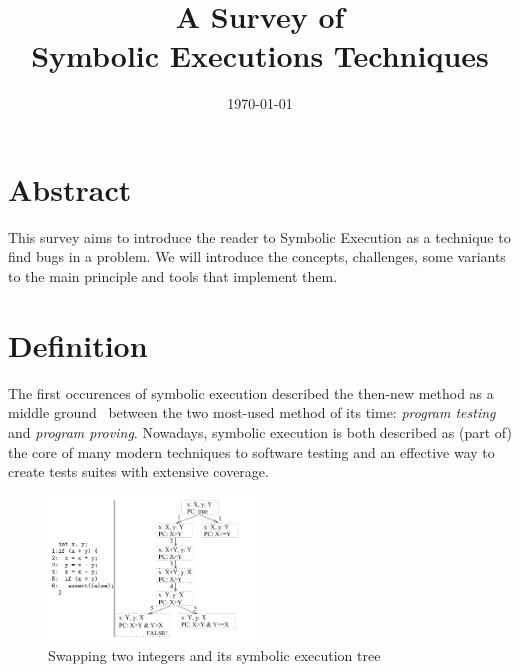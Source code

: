 \documentclass[11pt, conference]{IEEEtran}
\begin{document}
\title{A Survey of\\Symbolic Executions Techniques} %
\author{
  \and
}
\date{\today}
\maketitle

  \section*{Abstract}
    This survey aims to introduce the reader to Symbolic Execution as a technique to find bugs in a problem. We will introduce the concepts, challenges, some variants to the main principle and tools that implement them.

  \section{Definition}
      The first occurences of symbolic execution described the then-new method as a middle ground~\cite{newapproach} between the two most-used method of its time: \emph{program testing} and \emph{program proving}.
      Nowadays, symbolic execution is both described as (part of) the core of many modern techniques to software testing\cite{chopper:icse18} and an effective way to create tests suites with extensive coverage.\cite{threedecadeslater}
      \begin{figure}
		    \centering
        \includegraphics[width=0.5\textwidth]{symbolicsimple}
        \caption{Swapping two integers and its symbolic execution tree}
        \label{fig:symbolicsimple}
      \end{figure}
\end{document}
